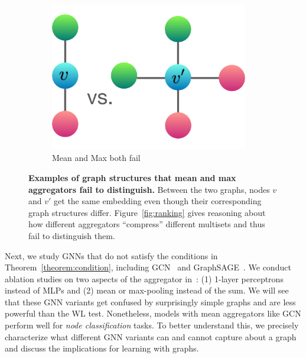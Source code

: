 \begin{figure}[t]
    \begin{subfigure}[b]{0.25\textwidth}
        \includegraphics[width=0.95\textwidth]{graph2_center.pdf} \vspace{-0.1in}
        \caption{Mean and Max both fail}
        \label{fig:mean-fail}
    \end{subfigure}
    \caption{{\bf Examples of graph structures that mean and max aggregators fail to distinguish.} Between the two graphs, nodes $v$ and $v'$ get the same embedding even though their corresponding graph structures differ.
    Figure~\ref{fig:ranking} gives reasoning about how different aggregators ``compress'' different multisets and thus fail to distinguish them. 
    }
\label{fig:graphs-fail}
 \vspace{-0.1in}
\end{figure}

Next, we study GNNs that do not satisfy the conditions in Theorem~\ref{theorem:condition}, including GCN~\citep{kipf2016semi} and GraphSAGE~\citep{hamilton2017inductive}. We conduct ablation studies on two aspects of the aggregator in~: (1) 1-layer perceptrons instead of MLPs and (2) mean or max-pooling instead of the sum.  We will see that these GNN variants get confused by surprisingly simple graphs and are less powerful than the WL test. Nonetheless, models with mean aggregators like GCN perform well for \textit{node classification} tasks. To better understand this, we precisely characterize what different GNN variants can and cannot capture about a graph and discuss the implications for learning with graphs.

